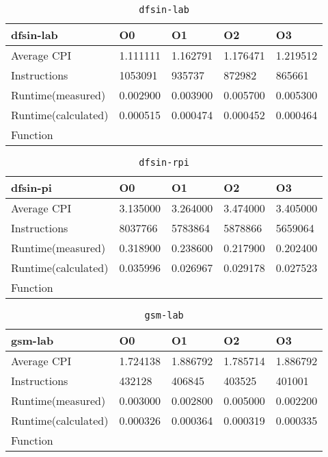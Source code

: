 \begin{table}[ht!]
\centering
\caption{\texttt{dfsin-lab}}
\label{tab:dfsin-lab}
\begin{tabular}{|l|l|l|l|l|}
\hline
\textbf{dfsin-lab}	&	\textbf{O0}	&	\textbf{O1}	&	\textbf{O2}	&	\textbf{O3}	\\\hline\hline
Average CPI	&	1.111111	&	1.162791	&	1.176471	&	1.219512	\\\hline
Instructions	&	1053091	&	935737	&	872982	&	865661	\\\hline
Runtime(measured)	&	0.002900	&	0.003900	&	0.005700	&	0.005300	\\\hline
Runtime(calculated)	&	0.000515	&	0.000474	&	0.000452	&	0.000464	\\\hline
Function	&		&		&		&		\\\hline
\end{tabular}
\end{table}
\begin{table}[ht!]
\centering
\caption{\texttt{dfsin-rpi}}
\label{tab:dfsin-rpi}
\begin{tabular}{|l|l|l|l|l|}
\hline
\textbf{dfsin-pi}	&	\textbf{O0}	&	\textbf{O1}	&	\textbf{O2}	&	\textbf{O3}	\\\hline\hline
Average CPI	&	3.135000	&	3.264000	&	3.474000	&	3.405000	\\\hline
Instructions	&	8037766	&	5783864	&	5878866	&	5659064	\\\hline
Runtime(measured)	&	0.318900	&	0.238600	&	0.217900	&	0.202400	\\\hline
Runtime(calculated)	&	0.035996	&	0.026967	&	0.029178	&	0.027523	\\\hline
Function	&		&		&		&		\\\hline
\end{tabular}
\end{table}
\begin{table}[ht!]
\centering
\caption{\texttt{gsm-lab}}
\label{tab:gsm-lab}
\begin{tabular}{|l|l|l|l|l|}
\hline
\textbf{gsm-lab}	&	\textbf{O0}	&	\textbf{O1}	&	\textbf{O2}	&	\textbf{O3}	\\\hline\hline
Average CPI	&	1.724138	&	1.886792	&	1.785714	&	1.886792	\\\hline
Instructions	&	432128	&	406845	&	403525	&	401001	\\\hline
Runtime(measured)	&	0.003000	&	0.002800	&	0.005000	&	0.002200	\\\hline
Runtime(calculated)	&	0.000326	&	0.000364	&	0.000319	&	0.000335	\\\hline
Function	&		&		&		&		\\\hline
\end{tabular}
\end{table}
